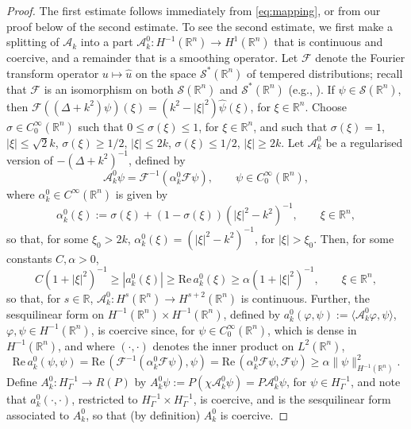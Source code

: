 \documentclass{birkjour}
\theoremstyle{definition}
\theoremstyle{remark}
\numberwithin{equation}{section}
\newcommand{\R}{\mathbb{R}}
\newcommand{\cS}{\mathcal{S}}
\newcommand{\cA}{\mathcal{A}}
\newcommand{\cF}{\mathcal{F}}
\newcommand{\rea}{\mathrm{Re}\,}
\begin{document}
\begin{proof} The first estimate follows immediately from \eqref{eq:mapping}, or from our proof below of the second estimate. To see the second estimate, we first make a splitting of $\cA_k$ into a part $\cA_k^0:H^{-1}(\R^n)\to H^1(\R^n)$ that is continuous and coercive, and a remainder that is a smoothing operator.
Let $\cF$ denote the Fourier transform operator $u\mapsto \hat u$ on the space $\cS^*(\R^n)$ of tempered distributions; recall that $\cF$ is an isomorphism on both $\cS(\R^n)$ and $\cS^*(\R^n)$ (e.g., \cite{mclean2000strongly}). If $\psi\in \cS(\R^n)$, then
$\cF((\Delta + k^2)\psi)(\xi) = (k^2-|\xi|^2)\hat\psi(\xi)$, for $\xi\in \R^n$. Choose $\sigma\in C_0^\infty(\R^n)$ such that $0\leq \sigma(\xi)\leq 1$, for $\xi\in \R^n$, and such that $\sigma(\xi)=1$, $|\xi|\leq \sqrt{2}k$, $\sigma(\xi)\geq 1/2$, $|\xi|\leq 2k$, $\sigma(\xi)\leq 1/2$, $|\xi|\geq 2k$. Let $\cA_k^0$ be a regularised version of $-(\Delta+k^2)^{-1}$, defined by
$$
\cA_k^0 \psi = \cF^{-1}(\alpha_k^0\cF\psi), \qquad \psi\in C_0^\infty(\R^n), 
$$
where $\alpha_k^0\in C^\infty(\R^n)$ is given by
$$
\alpha_k^0(\xi) := \sigma(\xi) + (1-\sigma(\xi))(|\xi|^2-k^2)^{-1}, \qquad \xi\in \R^n,
$$
so that, for some $\xi_0>2k$,  $\alpha_k^0(\xi) = (|\xi|^2-k^2)^{-1}$, for $|\xi|>\xi_0$.
Then, for some constants $C,\alpha>0$,
$$
C(1+|\xi|^2)^{-1} \geq |a_k^0(\xi)| \geq \rea a_k^0(\xi) \geq \alpha(1+|\xi|^2)^{-1}, \qquad \xi \in \R^n,
$$
so that, for $s\in \R$, $\cA^0_k:H^s(\R^n) \to H^{s+2}(\R^n)$ is continuous. Further, the sesquilinear form on $H^{-1}(\R^n) \times H^{-1}(\R^n)$, defined by $a^0_k(\varphi,\psi) := \langle \cA^0_k\varphi,\psi\rangle$,  $\varphi,\psi\in H^{-1}(\R^n)$, is coercive  since, for $\psi\in C_0^\infty(\R^n)$, which is dense in $H^{-1}(\R^n)$, and where $(\cdot,\cdot)$ denotes the inner product on $L^2(\R^n)$,
$$
\rea a^0_k(\psi,\psi) = \rea(\cF^{-1}(\alpha_k^0\cF\psi),\psi)=\rea(\alpha_k^0\cF\psi,\cF\psi) \geq \alpha \|\psi\|_{H^{-1}(\R^n)}^2.
$$
Define $A_k^0:H^{-1}_\Gamma\to R(P)$ by $A_k^0\psi:= P(\chi \cA_k^0\psi)=P\cA_k^0\psi$, for $\psi\in H^{-1}_\Gamma$, and note that $a_k^0(\cdot,\cdot)$, restricted to $H^{-1}_\Gamma \times H^{-1}_\Gamma$, is coercive, and is the sesquilinear form associated to $A_k^0$, so that (by definition) $A_k^0$ is coercive. 


\end{proof}
\end{document}
